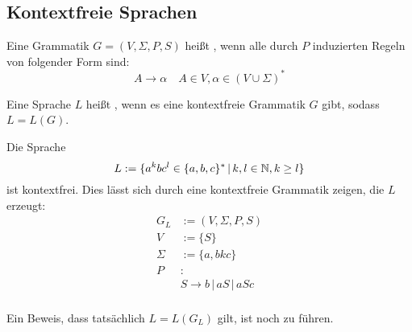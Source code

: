 \subsection{Kontextfreie Sprachen}

\begin{definition}
	Eine Grammatik $G = (V, \Sigma, P, S)$ heißt , wenn
	alle durch $P$ induzierten Regeln von folgender Form sind:
	\begin{equation}
		A \rightarrow \alpha \quad A \in V, \alpha \in (V \cup \Sigma)^*
	\end{equation}
\end{definition}

\begin{definition}
	Eine Sprache $L$ heißt , wenn es eine kontextfreie
	Grammatik $G$ gibt, sodass $L = L(G)$.
\end{definition}

\begin{example}
	Die Sprache
	\begin{equation}
		\label{thinf:cf:lang_1}
		L := \{a^kbc^l \in \{a,b,c\}^* \,|\, k,l \in \mathbb{N}, k \geq l \}
	\end{equation}
	ist kontextfrei. Dies lässt sich durch eine kontextfreie Grammatik
	zeigen, die $L$ erzeugt:
	\begin{align*}
		G_L & := (V,\Sigma,P,S) \\
		V & := \{S \} \\
		\Sigma & := \{a,bkc \} \\
		P & \colon \\
		       & S \rightarrow b \,|\, aS \,|\, aSc  \\
	\end{align*}

	Ein Beweis, dass tatsächlich $L = L(G_L)$ gilt, ist noch zu führen.
\end{example}

